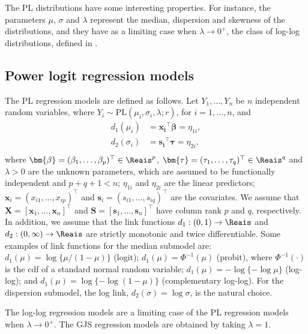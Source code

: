 The PL distributions have some interesting properties. For instance, the parameters $\mu$, $\sigma$ and $\lambda$ represent the median, dispersion and skewness of the distributions, and they have as a limiting case when $\lambda \rightarrow 0^+$, the class of log-log distributions, defined in \cite{QueirozFerrari2023}.


\subsection{Power logit regression models}

The PL regression models are defined as follows. Let $Y_1,\ldots,Y_n$ be $n$ independent random variables, where $Y_i \sim \text{PL}(\mu_i, \sigma_i, \lambda; r)$, for $i=1,\ldots,n$, and
%
\begin{equation}\label{linkfun}
\begin{split}
d_1 (\mu_i) &= \bm{x_i}^{\top} \bm{\beta} = \eta_{1i}, \\ 
d_2 (\sigma_i) &= \bm{s_i}^{\top} \bm{\tau} = \eta_{2i},\\
\end{split} 
\end{equation}
%
where $\bm{\beta}=(\beta_1, \ldots, \beta_p)^{\top} \in \Reais^p$, $\bm{\tau}=(\tau_1, \ldots, \tau_q)^{\top} \in \Reais^q$ and $\lambda>0$ are the unknown parameters, which are assumed to be functionally independent and $p+q+1<n$; $\eta_{1i}$ and $\eta_{2i}$ are the linear predictors; $\bm{x}_i = (x_{i1}, \ldots, x_{ip})^{\top}$ and $\bm{s}_i = (s_{i1}, \ldots, s_{iq})^{\top}$ are the covariates. We assume that $\textbf{X}=[\bm{x}_1,\ldots,\bm{x}_n]^\top$ and $\textbf{S}=[\bm{s}_1,\ldots,\bm{s}_n]^\top$ have column rank $p$ and $q$, respectively. In addition, we assume that the link functions $d_1:(0,1)\to\Reais$ and
$d_2:(0,\infty)\to\Reais$ are strictly monotonic and twice differentiable. Some examples of link functions for the median submodel are: $d_1(\mu) = \log \{\mu/(1-\mu)\}$ (logit); $d_1(\mu) = \Phi^{-1}(\mu)$ (probit), where $\Phi^{-1}(\cdot)$ is the cdf of a standard normal random variable; $d_1(\mu) = - \log \{ - \log \mu \}$ (log-log); and $d_1(\mu) = \log \{ - \log(1-\mu)\}$ (complementary log-log). For the dispersion submodel, the log link, $d_2(\sigma) = \log \sigma$, is the natural choice.

The log-log regression models are a limiting case of the PL regression models when $\lambda \rightarrow 0^+$. The GJS regression models \citep{LemonteBazan2016} are obtained by taking $\lambda = 1$. 

